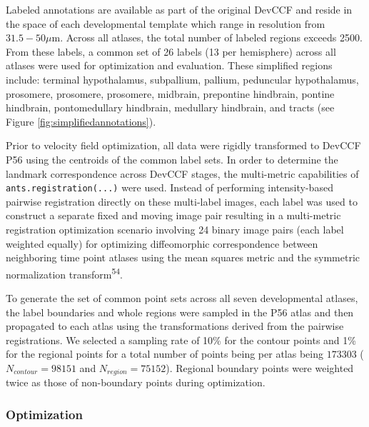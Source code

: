 \documentclass[
  12pt,
]{article}
\begin{document}
Labeled annotations are available as part of the original DevCCF and
reside in the space of each developmental template which range in
resolution from \(31.5-50 \mu\)m. Across all atlases, the total number
of labeled regions exceeds 2500. From these labels, a common set of 26
labels (13 per hemisphere) across all atlases were used for optimization
and evaluation. These simplified regions include: terminal hypothalamus,
subpallium, pallium, peduncular hypothalamus, prosomere, prosomere,
prosomere, midbrain, prepontine hindbrain, pontine hindbrain,
pontomedullary hindbrain, medullary hindbrain, and tracts (see Figure
\ref{fig:simplifiedannotations}).

Prior to velocity field optimization, all data were rigidly transformed
to DevCCF P56 using the centroids of the common label sets. In order to
determine the landmark correspondence across DevCCF stages, the
multi-metric capabilities of \texttt{ants.registration(...)} were used.
Instead of performing intensity-based pairwise registration directly on
these multi-label images, each label was used to construct a separate
fixed and moving image pair resulting in a multi-metric registration
optimization scenario involving 24 binary image pairs (each label
weighted equally) for optimizing diffeomorphic correspondence between
neighboring time point atlases using the mean squares metric and the
symmetric normalization transform\textsuperscript{54}.

To generate the set of common point sets across all seven developmental
atlases, the label boundaries and whole regions were sampled in the P56
atlas and then propagated to each atlas using the transformations
derived from the pairwise registrations. We selected a sampling rate of
10\% for the contour points and 1\% for the regional points for a total
number of points being per atlas being \(173303\)
(\(N_{contour} = 98151\) and \(N_{region}=75152\)). Regional boundary
points were weighted twice as those of non-boundary points during
optimization.

\subsubsection{Optimization}\label{optimization}
\end{document}
